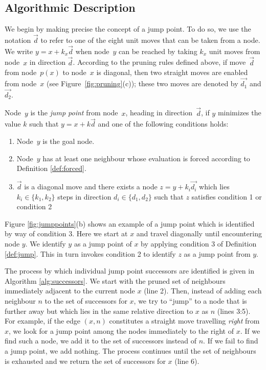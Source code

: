 \subsection{Algorithmic Description}
We begin by making precise the concept of a jump point.  
To do so, we use the notation $\vec{d}$ 
to refer to one of the eight unit moves that can be taken from a node.  
We write $y = x + k_{x}\vec{d}$ when node~$y$ can be reached 
by taking $k_{x}$ unit moves from node~$x$ in direction $\vec{d}$.
According to the pruning rules defined above, 
if move~$\vec{d}$ from node~$p(x)$ to node~$x$ is diagonal, 
then two straight moves are enabled from node~$x$ 
(see Figure~\ref{fig:pruning}(c)); 
these two moves are denoted by $\vec{d_1}$ and $\vec{d_2}$.  

\begin{definition}
\label{def:jump}
Node~$y$ is the \emph{jump point} from node~$x$, heading in direction~$\vec{d}$,
if $y$ minimizes the value $k$ such that $y = x + k \vec{d}$ and one of the
following conditions holds:
\begin{enumerate}
\item{Node~$y$ is the goal node.}
\item{Node~$y$ has at least one neighbour whose evaluation is forced according 
to Definition \ref{def:forced}.}
\item{$\vec{d}$ is a diagonal move and there exists a node $z = y +
k_i\vec{d_{i}}$ which lies $k_i \in \{k_1, k_2\}$ steps in direction $d_i \in
\{d_1,d_2\}$ such that $z$ satisfies condition 1 or condition 2 }
\end{enumerate}
\end{definition}

Figure \ref{fig:jumppoints}(b) shows an example of a jump point which is
identified by way of condition 3.
Here we start at $x$ and travel diagonally until encountering node $y$. 
We identify $y$ as a jump point of $x$ by applying condition 3 of 
Definition \ref{def:jump}. This in turn invokes condition 2 to identify $z$ 
as a jump point from $y$. 



The process by which individual jump point successors are identified is given in
Algorithm \ref{alg:successors}.  We start with the pruned set of neighbours
immediately adjacent to the current node $x$ (line 2).  Then, instead of adding each
neighbour $n$ to the set of successors for $x$, we try to ``jump'' to a node
that is further away but which lies in the same relative direction to $x$ as $n$
(lines 3:5).  For example, if the edge $(x, n)$ constitutes a straight move
travelling \emph{right} from $x$, we look for a jump point among the nodes
immediately to the right of $x$.  If we find such a node, we add it to the set
of successors instead of $n$.  If we fail to find a jump point,
we add nothing.  The process continues until the set of neighbours is
exhausted and we return the set of successors for $x$ (line 6).

